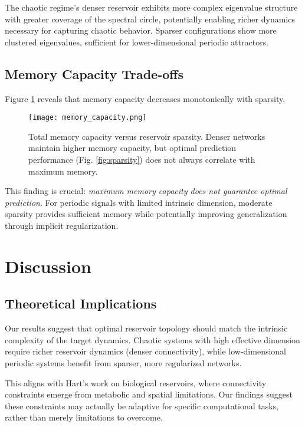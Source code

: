 \documentclass[11pt,a4paper]{article}
\begin{document}
The chaotic regime's denser reservoir exhibits more complex eigenvalue structure with greater coverage of the spectral circle, potentially enabling richer dynamics necessary for capturing chaotic behavior. Sparser configurations show more clustered eigenvalues, sufficient for lower-dimensional periodic attractors.

\subsection{Memory Capacity Trade-offs}

Figure \ref{fig:memory} reveals that memory capacity decreases monotonically with sparsity.

\begin{figure}[h]
    \centering
    \texttt{[image: memory\_capacity.png]}
    \caption{Total memory capacity versus reservoir sparsity. Denser networks maintain higher memory capacity, but optimal prediction performance (Fig. \ref{fig:sparsity}) does not always correlate with maximum memory.}
    \label{fig:memory}
\end{figure}

This finding is crucial: \emph{maximum memory capacity does not guarantee optimal prediction}. For periodic signals with limited intrinsic dimension, moderate sparsity provides sufficient memory while potentially improving generalization through implicit regularization.

\section{Discussion}

\subsection{Theoretical Implications}

Our results suggest that optimal reservoir topology should match the intrinsic complexity of the target dynamics. Chaotic systems with high effective dimension require richer reservoir dynamics (denser connectivity), while low-dimensional periodic systems benefit from sparser, more regularized networks.

This aligns with Hart's work \citep{hart2022brain} on biological reservoirs, where connectivity constraints emerge from metabolic and spatial limitations. Our findings suggest these constraints may actually be adaptive for specific computational tasks, rather than merely limitations to overcome.
\end{document}
